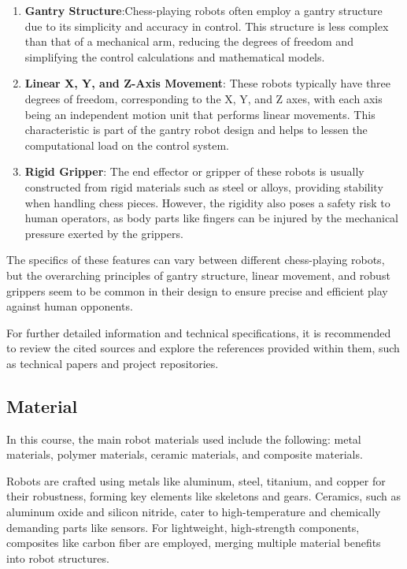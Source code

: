 \documentclass[10pt, a4paper, twocolumn]{article}
\begin{document}
\begin{enumerate}
    \item \textbf{Gantry Structure}:Chess-playing robots often employ a gantry structure due to its simplicity and accuracy in control. This structure is less complex than that of a mechanical arm, reducing the degrees of freedom and simplifying the control calculations and mathematical models.\cite{rao2023robot}
    
    \item \textbf{Linear X, Y, and Z-Axis Movement}: These robots typically have three degrees of freedom, corresponding to the X, Y, and Z axes, with each axis being an independent motion unit that performs linear movements. This characteristic is part of the gantry robot design and helps to lessen the computational load on the control system.\cite{du2013compliance}\cite{gupta2015autonomous}

    \item \textbf{Rigid Gripper}: The end effector or gripper of these robots is usually constructed from rigid materials such as steel or alloys, providing stability when handling chess pieces. However, the rigidity also poses a safety risk to human operators, as body parts like fingers can be injured by the mechanical pressure exerted by the grippers.
\end{enumerate}

The specifics of these features can vary between different chess-playing robots, but the overarching principles of gantry structure, linear movement, and robust grippers seem to be common in their design to ensure precise and efficient play against human opponents.

For further detailed information and technical specifications, it is recommended to review the cited sources and explore the references provided within them, such as technical papers and project repositories.

\subsection{Material}
In this course, the main robot materials used include the following: metal materials, polymer materials, ceramic materials, and composite materials.

Robots are crafted using metals like aluminum, steel, titanium, and copper for their robustness, forming key elements like skeletons and gears. Ceramics, such as aluminum oxide and silicon nitride, cater to high-temperature and chemically demanding parts like sensors. For lightweight, high-strength components, composites like carbon fiber are employed, merging multiple material benefits into robot structures.\cite{nelson_csc297_materials}
\end{document}
